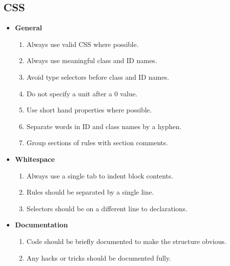 \documentclass[11pt,a4paper]{article}
\begin{document}
\subsection{CSS}
\begin{itemize}
\item \textbf{General}
	\begin{enumerate}
	\item Always use valid CSS where possible.
    \item Always use meaningful class and ID names.
    \item Avoid type selectors before class and ID names.
    \item Do not specify a unit after a 0 value.
    \item Use short hand properties where possible.
    \item Separate words in ID and class names by a hyphen.
    \item Group sections of rules with section comments.
	\end{enumerate}
\item \textbf{Whitespace}
	\begin{enumerate}
    \item Always use a single tab to indent block contents.
    \item Rules should be separated by a single line.
    \item Selectors should be on a different line to declarations.
	\end{enumerate}
\item \textbf{Documentation}
	\begin{enumerate}
	\item Code should be briefly documented to make the structure obvious.
    \item Any hacks or tricks should be documented fully.
	\end{enumerate}
\end{itemize}
\end{document}
